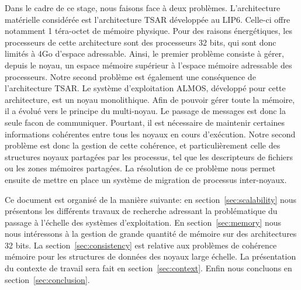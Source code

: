   \hspace{1cm}Dans le cadre de ce stage, nous faisons face à deux
  problèmes. L'architecture matérielle considérée est l'architecture TSAR
  développée au LIP6. Celle-ci offre notamment 1 téra-octet de mémoire
  physique. Pour des raisons énergétiques, les processeurs de cette architecture
  sont des processeurs 32 bits, qui sont donc limités à 4Go d'espace
  adressable. Ainsi, le premier problème consiste à gérer, depuis le noyau, un
  espace mémoire supérieur à l'espace mémoire adressable des processeurs. Notre
  second problème est également une conséquence de l'architecture TSAR. Le
  système d'exploitation ALMOS, développé pour cette architecture, est un noyau
  monolithique. Afin de pouvoir gérer toute la mémoire, il a évolué vers le
  principe du multi-noyau. Le passage de messages est donc la seule facon de
  communiquer. Pourtant, il est nécessaire de maintenir certaines informations
  cohérentes entre tous les noyaux en cours d'exécution. Notre second problème
  est donc la gestion de cette cohérence, et particulièrement celle des
  structures noyaux partagées par les processus, tel que les descripteurs de
  fichiers ou les zones mémoires partagées. La résolution de ce problème nous
  permet ensuite de mettre en place un système de migration de processus
  inter-noyaux.\newline

  \hspace{1cm}Ce document est organisé de la manière suivante: en
  section~\ref{sec:scalability} nous présentons les différents travaux de
  recherche adressant la problématique du passage à l'échelle des systèmes
  d'exploitation. En section~\ref{sec:memory} nous nous intéressons à la gestion
  de grande quantité de mémoire sur des architectures 32 bits. La
  section~\ref{sec:consistency} est relative aux problèmes de cohérence mémoire
  pour les structures de données des noyaux large échelle. La présentation du
  contexte de travail sera fait en section~\ref{sec:context}. Enfin nous
  concluons en section~\ref{sec:conclusion}.
